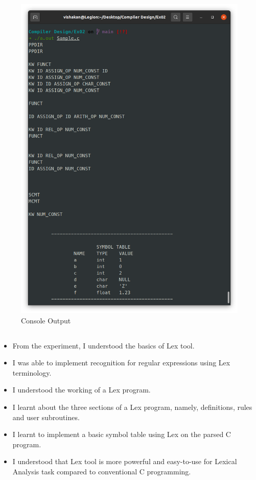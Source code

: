 \documentclass[12pt, a4]{article}
\begin{document}
\subsection*{}
\begin{figure}[h]
\centering
\caption{Console Output}
\includegraphics[height = 16cm, width = 15cm]{Output.png}
\end{figure}


\newpage
\subsection*{}
\begin{itemize}

\item From the experiment, I understood the basics of Lex tool.
\item I was able to implement recognition for regular expressions using Lex terminology.	
\item I understood the working of a Lex program.
\item I learnt about the three sections of a Lex program, namely, definitions, rules and user subroutines.
\item I learnt to implement a basic symbol table using Lex on the parsed C program.
\item I understood that Lex tool is more powerful and easy-to-use for Lexical Analysis task compared to conventional C programming.

\end{itemize}
\end{document}

